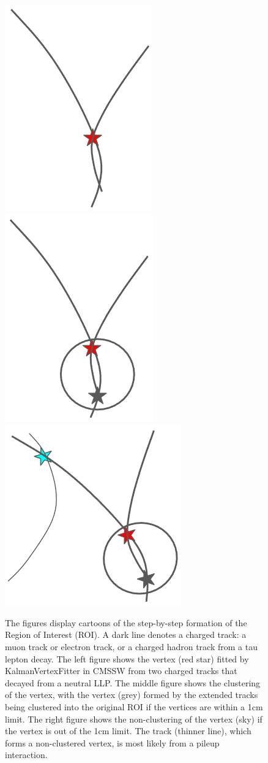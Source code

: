 \begin{figure}[h!]
  \centering
  \includegraphics[width=0.27\linewidth]{figs/MLP3.png}
  \includegraphics[width=0.27\linewidth]{figs/MLP2.png}
  \includegraphics[width=0.27\linewidth]{figs/MLP1.png}
\caption{
        The figures display cartoons of the step-by-step formation of the Region of Interest (ROI).
        A dark line denotes a charged track: a muon track or electron track, or a charged hadron track from a tau lepton decay.
        The left figure shows the vertex (red star) fitted by KalmanVertexFitter in CMSSW from two charged tracks that decayed from a neutral LLP.
        The middle figure shows the clustering of the vertex, with the vertex (grey) formed by the extended tracks being clustered into the original ROI if the vertices are within a 1cm limit.
        The right figure shows the non-clustering of the vertex (sky) if the vertex is out of the 1cm limit. The track (thinner line), which forms a non-clustered vertex, is most likely from a pileup interaction.
	}
  \label{fig:Clustering}
\end{figure}

